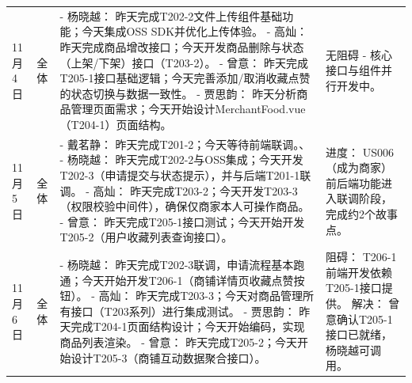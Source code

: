 \begin{levellist}
\begin{longtable}{>{\centering\arraybackslash}m{1cm} >{\centering\arraybackslash}m{1cm} >{\centering\arraybackslash}m{9cm} >{\centering\arraybackslash}m{2.5cm}}
        11月4日                                                   & 全体                                                     & - 杨晓越： 昨天完成T202-2文件上传组件基础功能；今天集成OSS SDK并优化上传体验。 \newline
        - 高灿： 昨天完成商品增改接口；今天开发商品删除与状态（上架/下架）接口（T203-2）。 \newline
        - 曾意： 昨天完成T205-1接口基础逻辑；今天完善添加/取消收藏点赞的状态切换与数据一致性。 \newline
        - 贾思韵： 昨天分析商品管理页面需求；今天开始设计MerchantFood.vue（T204-1）页面结构。 & 无阻碍 - 核心接口与组件并行开发中。                                                                                                                                 \\
        11月5日                                                   & 全体                                                     & - 戴茗静： 昨天完成T201-2；今天等待前端联调。、 \newline
        - 杨晓越： 昨天完成T202-2与OSS集成；今天开发T202-3（申请提交与状态提示），并与后端T201-1联调。 \newline
        - 高灿： 昨天完成T203-2；今天开发T203-3（权限校验中间件），确保仅商家本人可操作商品。 \newline
        - 曾意： 昨天完成T205-1接口测试；今天开始开发T205-2（用户收藏列表查询接口）。          & 进度： US006（成为商家）前后端功能进入联调阶段，完成约2个故事点。                                                                                                                \\
        11月6日                                                   & 全体                                                     & - 杨晓越： 昨天完成T202-3联调，申请流程基本跑通；今天开始开发T206-1（商铺详情页收藏点赞按钮）。 \newline
        - 高灿： 昨天完成T203-3；今天对商品管理所有接口（T203系列）进行集成测试。 \newline
        - 贾思韵： 昨天完成T204-1页面结构设计；今天开始编码，实现商品列表渲染。 \newline
        - 曾意： 昨天完成T205-2；今天开始设计T205-3（商铺互动数据聚合接口）。              & 阻碍： T206-1前端开发依赖T205-1接口提供。 \newline
        解决： 曾意确认T205-1接口已就绪，杨晓越可调用。                                                                                                                                                                                   \\

\end{longtable}
\end{levellist}
